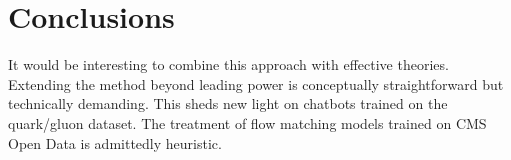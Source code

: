 \section{Conclusions}\label{sec:conclusions}

It would be interesting to combine this approach with effective
theories. Extending the method beyond leading power is conceptually
straightforward but technically demanding. This sheds new light on
chatbots trained on the quark/gluon dataset. The treatment of flow
matching models trained on CMS Open Data is admittedly heuristic.

